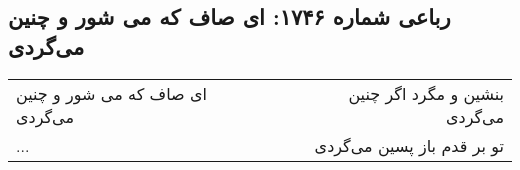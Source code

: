 \begin{center}
\section*{رباعی شماره ۱۷۴۶: ای صاف که می شور و چنین می‌گردی}
\label{sec:1746}
\begin{longtable}{l p{0.5cm} r}
ای صاف که می شور و چنین می‌گردی
&&
بنشین و مگرد اگر چنین می‌گردی
\\
...
&&
تو بر قدم باز پسین می‌گردی
\\
\end{longtable}
\end{center}
